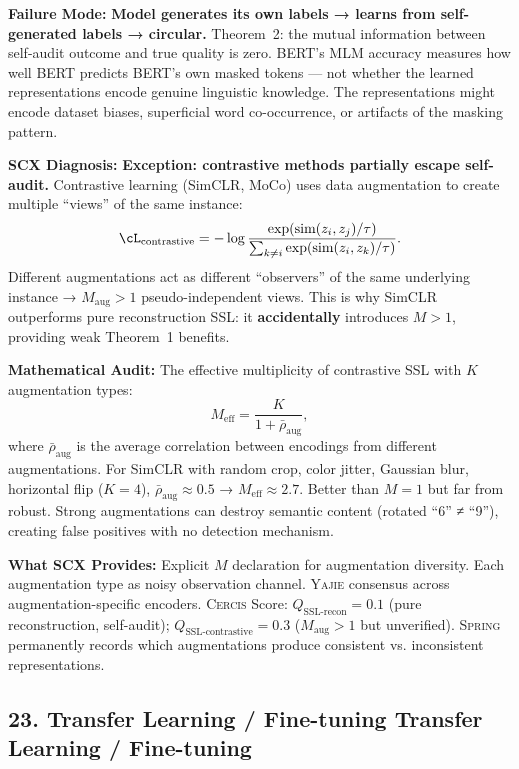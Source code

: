 \documentclass[12pt,a4paper]{article}
\theoremstyle{definition}
\newcommand{\Yajie}{\textsc{Yajie}}
\newcommand{\Spring}{\textsc{Spring}}
\newcommand{\Cercis}{\textsc{Cercis}}
\newcommand{\whyFail}{\noindent\textbf{Failure Mode:} }
\newcommand{\whatMissing}{\noindent\textbf{What SCX Provides:} }
\newcommand{\diagnosis}{\noindent\textbf{SCX Diagnosis:} }
\newcommand{\mathAudit}{\noindent\textbf{Mathematical Audit:} }
\begin{document}
\whyFail{} \textbf{Model generates its own labels → learns from self-generated labels → circular.} Theorem~2: the mutual information between self-audit outcome and true quality is zero. BERT's MLM accuracy measures how well BERT predicts BERT's own masked tokens — not whether the learned representations encode genuine linguistic knowledge. The representations might encode dataset biases, superficial word co-occurrence, or artifacts of the masking pattern.

\diagnosis{} \textbf{Exception: contrastive methods partially escape self-audit.} Contrastive learning (SimCLR, MoCo) uses data augmentation to create multiple ``views'' of the same instance:
\[
\cL_{\text{contrastive}} = -\log\frac{\exp(\text{sim}(z_i, z_j)/\tau)}{\sum_{k \neq i} \exp(\text{sim}(z_i, z_k)/\tau)}.
\]
Different augmentations act as different ``observers'' of the same underlying instance → $M_{\text{aug}} > 1$ pseudo-independent views. This is why SimCLR outperforms pure reconstruction SSL: it \textbf{accidentally} introduces $M>1$, providing weak Theorem~1 benefits.

\mathAudit{} The effective multiplicity of contrastive SSL with $K$ augmentation types:
\[
M_{\text{eff}} = \frac{K}{1 + \bar{\rho}_{\text{aug}}},
\]
where $\bar{\rho}_{\text{aug}}$ is the average correlation between encodings from different augmentations. For SimCLR with random crop, color jitter, Gaussian blur, horizontal flip ($K=4$), $\bar{\rho}_{\text{aug}} \approx 0.5$ → $M_{\text{eff}} \approx 2.7$. Better than $M=1$ but far from robust. Strong augmentations can destroy semantic content (rotated ``6'' ≠ ``9''), creating false positives with no detection mechanism.

\whatMissing{} Explicit $M$ declaration for augmentation diversity. Each augmentation type as noisy observation channel. \Yajie{} consensus across augmentation-specific encoders. \Cercis{} Score: $Q_{\text{SSL-recon}} = 0.1$ (pure reconstruction, self-audit); $Q_{\text{SSL-contrastive}} = 0.3$ ($M_{\text{aug}}>1$ but unverified). \Spring{} permanently records which augmentations produce consistent vs. inconsistent representations.

\subsection{23. Transfer Learning / Fine-tuning Transfer Learning / Fine-tuning}
\end{document}

